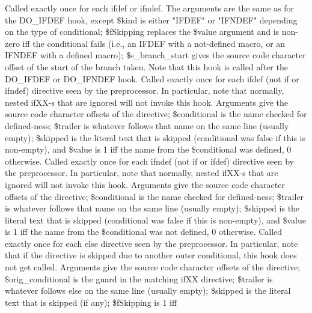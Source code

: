 Called exactly once for each \pphash{}ifdef or \pphash{}ifndef.
The arguments are the same as for the DO\_\-IFDEF hook, except \$kind is either
"IFDEF" or "IFNDEF" depending on the type of conditional; \$fSkipping
replaces the \$value argument and is non-zero iff the conditional fails
(i.e., an IFDEF with a not-defined macro, or an IFNDEF with a defined macro);
\$s\_\-branch\_\-start gives the source code character offset of the start of
the branch taken.  Note that this hook is called after the DO\_\-IFDEF or DO\_\-IFNDEF
hook.
Called exactly once for each \pphash{}ifdef
(not \pphash{}if or \pphash{}ifndef) directive seen by the preprocessor. In particular,
note that normally, nested \pphash{}ifXX-s that are ignored will not invoke this hook.
Arguments give the source code character
offsets of the directive; \$conditional is the name checked for defined-ness;
\$trailer is whatever follows that name on the same line (usually empty); \$skipped is
the literal text that is skipped (conditional was false if this is non-empty), and
\$value is 1 iff the name from the \$conditional was defined, 0 otherwise.
Called exactly once for each \pphash{}ifndef
(not \pphash{}if or \pphash{}ifdef) directive seen by the preprocessor. In particular,
note that normally, nested \pphash{}ifXX-s that are ignored will not invoke this hook.
Arguments give the source code character
offsets of the directive; \$conditional is the name checked for defined-ness;
\$trailer is whatever follows that name on the same line (usually empty); \$skipped is
the literal text that is skipped (conditional was false if this is non-empty), and
\$value is 1 iff the name from the \$conditional was not defined, 0 otherwise.
Called exactly once for each \pphash{}else directive seen by the preprocessor. In particular,
note that if the directive is skipped due to another outer conditional, this
hook does not get called.
Arguments give the source code character
offsets of the directive; \$orig\_\-conditional is the guard in the
matching \pphash{}ifXX directive; 
\$trailer is whatever follows \pphash{}else on the same line (usually empty); \$skipped is
the literal text that is skipped (if any); \$fSkipping is 1 iff
